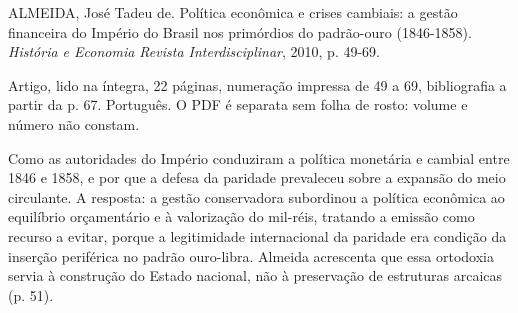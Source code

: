 
\begin{identificacao}
ALMEIDA, José Tadeu de. Política econômica e crises cambiais: a gestão financeira do Império do Brasil nos primórdios do padrão-ouro (1846-1858). \emph{História e Economia Revista Interdisciplinar}, 2010, p. 49-69.

Artigo, lido na íntegra, 22 páginas, numeração impressa de 49 a 69, bibliografia a partir da p. 67. Português. O PDF é separata sem folha de rosto: volume e número não constam.
\end{identificacao}

Como as autoridades do Império conduziram a política monetária e cambial entre 1846 e 1858, e por que a defesa da paridade prevaleceu sobre a expansão do meio circulante. A resposta: a gestão conservadora subordinou a política econômica ao equilíbrio orçamentário e à valorização do mil-réis, tratando a emissão como recurso a evitar, porque a legitimidade internacional da paridade era condição da inserção periférica no padrão ouro-libra. Almeida acrescenta que essa ortodoxia servia à construção do Estado nacional, não à preservação de estruturas arcaicas (p. 51).


